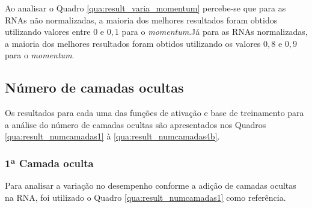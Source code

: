 \documentclass[12pt,oneside,a4paper,chapter=TITLE,section=TITLE,sumario
		=tradicional]{abntex2}
\begin{document}
		Ao analisar o Quadro \ref{qua:result_varia_momentum} percebe-se que para as RNAs não normalizadas, a maioria dos melhores resultados foram obtidos utilizando valores entre $0$ e $0,1$ para o \textit{momentum}.\hspace{0.1cm}Já para as RNAs normalizadas, a maioria dos melhores resultados foram obtidos utilizando os valores $0,8$ e $0,9$ para o \textit{momentum}.
		
		\subsection{Número de camadas ocultas}
		
		Os resultados para cada uma das funções de ativação e base de treinamento para a análise do número de camadas ocultas são apresentados nos Quadros \ref{qua:result_numcamadas1} à \ref{qua:result_numcamadas4b}.
		
		\subsubsection{1ª Camada oculta}
		
		Para analisar a variação no desempenho conforme a adição de camadas ocultas na RNA, foi utilizado o Quadro \ref{qua:result_numcamadas1} como referência.
		
\end{document}
